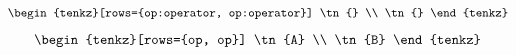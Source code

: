 \documentclass[varwidth=19cm, border=6pt]{standalone}
\begin{document}
\[
  \begin{tenkz}[rows={op:operator, op:operator}]
    \tn{} \\
    \tn{}
  \end{tenkz}
\]
\[
  \begin{tenkz}[rows={op, op}]
    \tn{A} \\
    \tn{B}
  \end{tenkz}
\]
\end{document}
